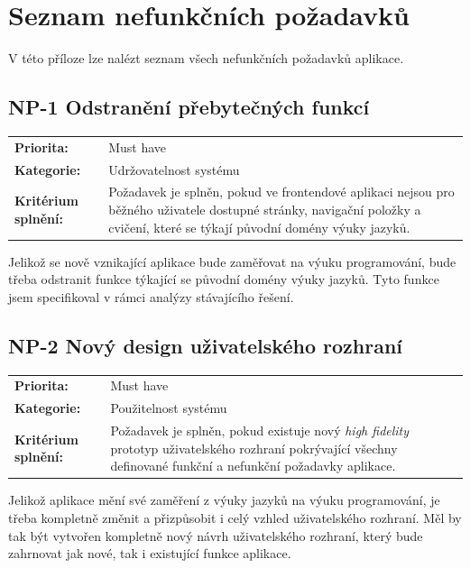 \chapter{Seznam nefunkčních požadavků}\label{chapter:non-functional-requirements-list}

V této příloze lze nalézt seznam všech nefunkčních požadavků aplikace.


\section{NP-1 Odstranění přebytečných funkcí}\label{sec:np-remove-extra-functions}

\begin{tabularx}{\linewidth}{lX}
    \textbf{Priorita:} & Must have \\
    \textbf{Kategorie:} & Udržovatelnost systému \\
    \textbf{Kritérium splnění:} & Požadavek je splněn, pokud ve frontendové aplikaci nejsou pro běžného uživatele dostupné stránky, navigační položky a cvičení, které se týkají původní domény výuky jazyků. \\
\end{tabularx}

Jelikož se nově vznikající aplikace bude zaměřovat na výuku programování, bude třeba odstranit funkce týkající se původní domény výuky jazyků. Tyto funkce jsem specifikoval v rámci analýzy stávajícího řešení.

\section{NP-2 Nový design uživatelského rozhraní}\label{sec:np-new-ui-design}

\begin{tabularx}{\linewidth}{lX}
    \textbf{Priorita:} & Must have \\
    \textbf{Kategorie:} & Použitelnost systému \\
    \textbf{Kritérium splnění:} & Požadavek je splněn, pokud existuje nový \textit{high fidelity} prototyp uživatelského rozhraní pokrývající všechny definované funkční a nefunkční požadavky aplikace. \\
\end{tabularx}

Jelikož aplikace mění své zaměření z výuky jazyků na výuku programování, je třeba kompletně změnit a přizpůsobit i celý vzhled uživatelského rozhraní. Měl by tak být vytvořen kompletně nový návrh uživatelského rozhraní, který bude zahrnovat jak nové, tak i existující funkce aplikace.

